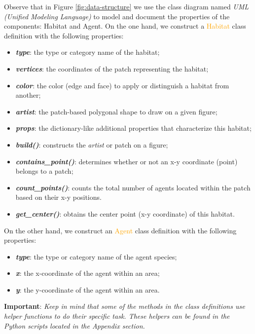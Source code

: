 \noindent
Observe that in Figure \ref{fig:data-structure} we use the class diagram named \emph{UML (Unified Modeling Language)} to model and document the properties of the components: Habitat and Agent. On the one hand, we construct a \textcolor{orange}{Habitat} class definition with the following properties:
\begin{itemize}
    \item \textbf{\textit{type}}: the type or category name of the habitat;
    \item \textbf{\textit{vertices}}: the coordinates of the patch representing the habitat;
    \item \textbf{\textit{color}}: the color (edge and face) to apply or distinguish a habitat from another;
    \item \textbf{\textit{artist}}: the patch-based polygonal shape to draw on a given figure;
    \item \textbf{\textit{props}}: the dictionary-like additional properties that characterize this habitat;
    \item \textbf{\textit{build()}}: constructs the \emph{artist} or patch on a figure;
    \item \textbf{\textit{contains\_point()}}: determines whether or not an x-y coordinate (point) belongs to a patch;
    \item \textbf{\textit{count\_points()}}: counts the total number of agents located within the patch based on their x-y positions.
    \item \textbf{\textit{get\_center()}}: obtains the center point (x-y coordinate)  of this habitat.
\end{itemize}

\noindent
On the other hand,  we construct an \textcolor{orange}{Agent} class definition with the following properties:
\begin{itemize}
    \item \textbf{\textit{type}}: the type or category name of the agent species;
    \item \textbf{\textit{x}}: the x-coordinate of the agent within an area;
    \item \textbf{\textit{y}}: the y-coordinate of the agent within an area.
\end{itemize}

\noindent
\textbf{Important}: \textit{Keep in mind that some of the methods in the class definitions use helper functions to do their specific task. These helpers can be found in the Python scripts located in the Appendix section.}

